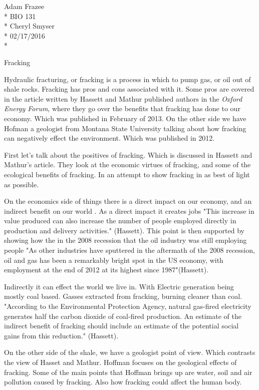 \documentclass[12pt]{article}
\begin{document}
	\begin{flushleft}
		Adam Frazee \\*
		BIO 131\\*
		Cheryl Smyser\\*
		02/17/2016\\*
	\end{flushleft}

\begin{center}
 \Large{Fracking}
\end{center}
\doublespacing

Hydraulic fracturing, or fracking is a process in which to pump gas, or oil out of shale rocks. Fracking has pros and cons associated with it. Some pros are covered in the article written by Hassett and Mathur published authors in the \textit{Oxford Energy Forum}, where they go over the benefits that fracking has done to our economy. Which was published in February of 2013. On the other side we have Hofman a geologist from Montana State University talking about how fracking can negatively effect the environment. Which was published in 2012.

First let's talk about the positives of fracking. Which is discussed in Hassett and Mathur's article. They look at the economic virtues of fracking, and some of the ecological benefits of fracking. In an attempt to show fracking in as best of light as possible. 

On the economics side of things there is a direct impact on our economy, and an indirect benefit on our world . As a direct impact it creates jobs "This increase in value produced can also increase the number of people employed directly in production and delivery activities." (Hassett). This point is then supported by showing how the in the 2008 recession that the oil industry was still employing people "As
other industries have sputtered in the
aftermath of the 2008 recession, oil and gas has been a remarkably bright spot in the US economy, with employment at the end of 2012 at its highest since 1987"(Hassett).

Indirectly it can effect the world we live in. With Electric generation being mostly coal based. Gasses extracted from fracking, burning cleaner than coal. "According to the Environmental Protection Agency, natural gas-fired electricity generates half the carbon dioxide of coal-fired production. An estimate of the indirect benefit of fracking should include an estimate of the potential social gains from this reduction." (Hassett). 
 
On the other side of the shale, we have a geologist point of view. Which contrasts the view of Hasset and Mathur. Hoffman focuses on the geological effects of fracking. Some of the main points that Hoffman brings up are water, soil and air pollution caused by fracking. Also how fracking could affect the human body.
\end{document}
